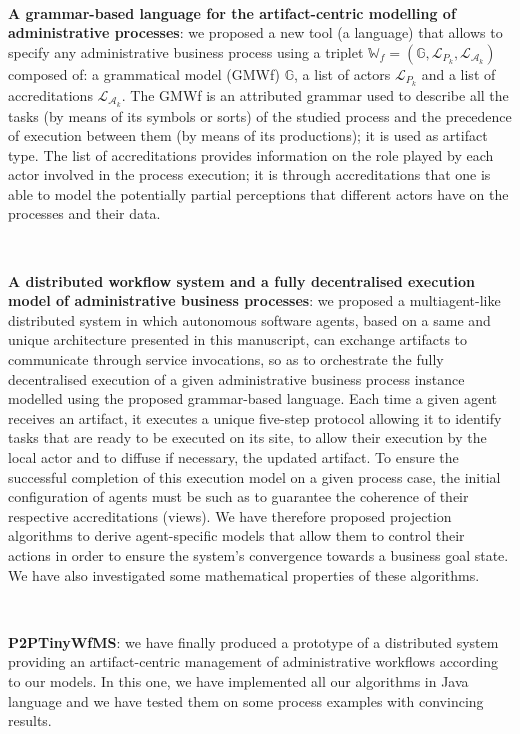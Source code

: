 ~

\noindent\textbf{A grammar-based language for the artifact-centric modelling of administrative processes}: we proposed a new tool (a language) that allows to specify any administrative business process using a triplet $\mathbb{W}_f=\left(\mathbb{G}, \mathcal{L}_{P_k}, \mathcal{L}_{\mathcal{A}_k} \right)$ composed of: 
a grammatical model (GMWf) $\mathbb{G}$, a list of actors $\mathcal{L}_{P_k}$ and a list of accreditations $\mathcal{L}_{\mathcal{A}_k}$. 
The GMWf is an attributed grammar used to describe all the tasks (by means of its symbols or sorts) of the studied process and the precedence of execution between them (by means of its productions); it is used as artifact type.
The list of accreditations provides information on the role played by each actor involved in the process execution; it is through accreditations that one is able to model the potentially partial perceptions that different actors have on the processes and their data.


~

\noindent\textbf{A distributed workflow system and a fully decentralised execution model of administrative business processes}: we proposed a multiagent-like distributed system in which autonomous software agents, based on a same and unique architecture presented in this manuscript, can exchange artifacts to communicate through service invocations, so as to orchestrate the fully decentralised execution of a given administrative business process instance modelled using the proposed grammar-based language. Each time a given agent receives an artifact, it executes a unique five-step protocol allowing it to identify tasks that are ready to be executed on its site, to allow their execution by the local actor and to diffuse if necessary, the updated artifact. To ensure the successful completion of this execution model on a given process case, the initial configuration of agents must be such as to guarantee the coherence of their respective accreditations (views). We have therefore proposed projection algorithms to derive agent-specific models that allow them to control their actions in order to ensure the system's convergence towards a business goal state. We have also investigated some mathematical properties of these algorithms. 


~

\noindent\textbf{P2PTinyWfMS}: we have finally produced a prototype of a distributed system providing an artifact-centric management of administrative workflows according to our models. In this one, we have implemented all our algorithms in Java language and we have tested them on some process examples with convincing results.


